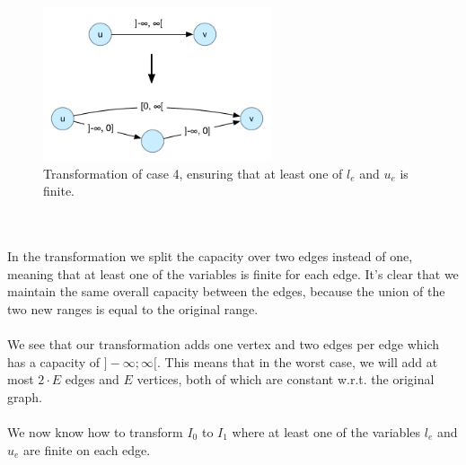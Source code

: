 \documentclass[12pt]{article}
\begin{document}
\begin{figure}[h]
  \centering
    \includegraphics[width=0.6\textwidth]{figures/e3_1}
  \caption{Transformation of case 4, ensuring that at least one of $l_e$ and $u_e$ is finite.}
    \label{fig:e3_1}
\end{figure}~\\
\\
In the transformation we split the capacity over two edges instead of one, meaning that at least one of the variables is finite for each edge. It's clear that we maintain the same overall capacity between the edges, because the union of the two new ranges is equal to the original range.\\
\\
We see that our transformation adds one vertex and two edges per edge which has a capacity of $]-\infty;\infty[$. This means that in the worst case, we will add at most $2\cdot E$ edges and $E$ vertices, both of which are constant w.r.t. the original graph.\\
\\
We now know how to transform $I_0$ to $I_1$ where at least one of the variables $l_e$ and $u_e$ are finite on each edge.
\end{document}
